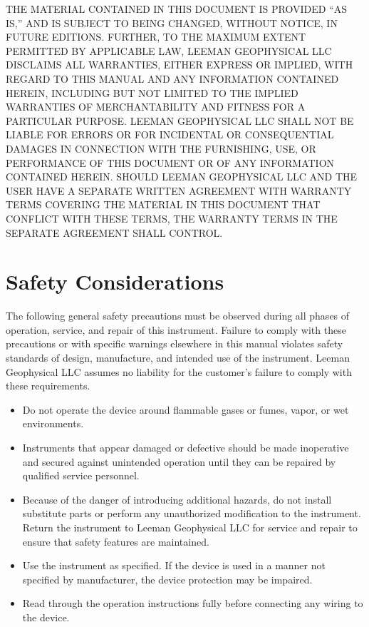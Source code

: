 \documentclass[letter,12pt,oneside,pdflatex,italian,final,twocolumn]{article}
\begin{document}
\newpage
\tableofcontents
\newpage

\noindent
THE MATERIAL CONTAINED IN THIS DOCUMENT IS PROVIDED “AS IS,” AND IS SUBJECT TO BEING CHANGED,
WITHOUT NOTICE, IN FUTURE EDITIONS. FURTHER, TO THE MAXIMUM EXTENT PERMITTED BY APPLICABLE
LAW, LEEMAN GEOPHYSICAL LLC DISCLAIMS ALL WARRANTIES, EITHER EXPRESS OR IMPLIED, WITH REGARD TO THIS MANUAL
AND ANY INFORMATION CONTAINED HEREIN, INCLUDING BUT NOT LIMITED TO THE IMPLIED WARRANTIES OF
MERCHANTABILITY AND FITNESS FOR A PARTICULAR PURPOSE.  LEEMAN GEOPHYSICAL LLC SHALL NOT BE LIABLE FOR ERRORS
OR FOR INCIDENTAL OR CONSEQUENTIAL DAMAGES IN CONNECTION WITH THE FURNISHING, USE, OR
PERFORMANCE OF THIS DOCUMENT OR OF ANY INFORMATION CONTAINED HEREIN. SHOULD LEEMAN
GEOPHYSICAL LLC AND THE USER HAVE A SEPARATE WRITTEN AGREEMENT WITH WARRANTY TERMS COVERING
THE MATERIAL IN THIS DOCUMENT THAT CONFLICT WITH THESE TERMS, THE WARRANTY TERMS IN THE
SEPARATE AGREEMENT SHALL CONTROL.




\newpage
\section{Safety Considerations}
The following general safety precautions must be observed during all phases of operation, service, and repair of this
instrument. Failure to comply with these precautions or with specific warnings elsewhere in this manual violates
safety standards of design, manufacture, and intended use of the instrument. Leeman Geophysical LLC assumes no
liability for the customer's failure to comply with these requirements.

\begin{itemize}
\item Do not operate the device around flammable gases or fumes, vapor, or wet environments.
\item Instruments that appear damaged or defective should be made inoperative and secured against unintended
operation until they can be repaired by qualified service personnel.
\item Because of the danger of introducing additional hazards, do not install substitute parts or perform any unauthorized
modification to the instrument. Return the instrument to Leeman Geophysical LLC for service
and repair to ensure that safety features are maintained.
\item Use the instrument as specified. If the device is used in a manner not specified by manufacturer, the device protection
may be impaired.
\item Read through the operation instructions fully before connecting any wiring to the device.
\end{itemize}
\end{document}
